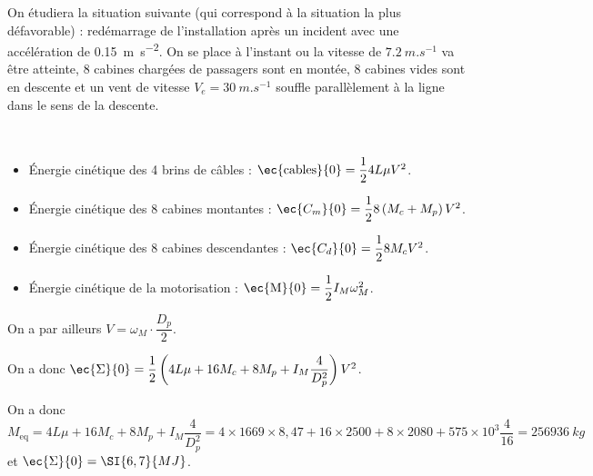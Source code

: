\fi
\begin{obj}
On étudiera la situation suivante (qui correspond à la situation la plus défavorable) : redémarrage de l’installation après un incident avec une accélération de \SI{0,15}{m.s^{-2}}. On se place à l’instant ou la vitesse de $\SI{7,2}{m.s^{-1}}$ va être atteinte, 8 cabines chargées de passagers sont en montée, 8 cabines vides sont en descente et un vent de vitesse $V_e = \SI{30}{m.s^{-1}}$ souffle parallèlement à la ligne dans le sens de la descente.
\end{obj}




\ifprof\begin{corrige} ~\\
\begin{itemize}
\item Énergie cinétique des 4 brins de câbles : $\ec{\text{cables}}{0} = \dfrac{1}{2}4 L \mu V^2$.
\item Énergie cinétique des 8 cabines montantes : $ \ec{{C_m}}{0} = \dfrac{1}{2}8  \left(M_c +  M_p\right) V^2$.
\item Énergie cinétique des 8 cabines descendantes : $\ec{{C_d}}{0} = \dfrac{1}{2}8  M_c V^2$.
\item Énergie cinétique de la motorisation : $\ec{\text{M}}{0} = \dfrac{1}{2}I_M  \omega_M^2$.
\end{itemize}

On a par ailleurs  $V=\omega_M \cdot \dfrac{D_p}{2}$.

On a donc $\ec{\Sigma}{0}= \dfrac{1}{2}\left(4 L \mu + 16 M_c + 8 M_p  + I_M\dfrac{4}{D_p^2}\right)V^2$.

On a donc $M_{\text{eq}}=4 L \mu + 16 M_c + 8 M_p  + I_M\dfrac{4}{D_p^2} = 4\times 1669 \times 8,47 + 16 \times 2500  + 8 \times 2080  + 575 \times 10^3 \dfrac{4}{16} = \SI{256936}{kg}$ et $\ec{\Sigma}{0}=\SI{6,7}{MJ}$.

\end{corrige}\else\fi



